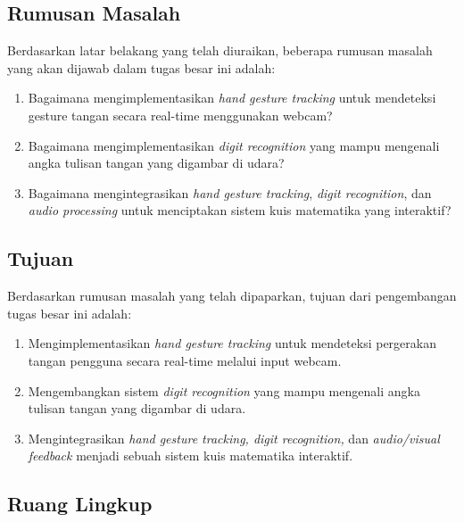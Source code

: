 \subsection{Rumusan Masalah}

Berdasarkan latar belakang yang telah diuraikan, beberapa rumusan masalah yang akan dijawab dalam tugas besar ini adalah:

\begin{enumerate}
    \item Bagaimana mengimplementasikan \textit{hand gesture tracking} untuk mendeteksi gesture tangan secara real-time menggunakan webcam?
    
    \item Bagaimana mengimplementasikan \textit{digit recognition} yang mampu mengenali angka tulisan tangan yang digambar di udara?
    
    \item Bagaimana mengintegrasikan \textit{hand gesture tracking}, \textit{digit recognition}, dan \textit{audio processing} untuk menciptakan sistem kuis matematika yang interaktif?  
  \end{enumerate}


\subsection{Tujuan}

Berdasarkan rumusan masalah yang telah dipaparkan, tujuan dari pengembangan tugas besar ini adalah:

\begin{enumerate}
    \item Mengimplementasikan \textit{hand gesture tracking} untuk mendeteksi pergerakan tangan pengguna secara real-time melalui input webcam.
    
    \item Mengembangkan sistem \textit{digit recognition} yang mampu mengenali angka tulisan tangan yang digambar di udara.
    
    \item Mengintegrasikan \textit{hand gesture tracking, digit recognition,} dan \textit{audio/visual feedback} menjadi sebuah sistem kuis matematika interaktif.
\end{enumerate}


\subsection{Ruang Lingkup}

